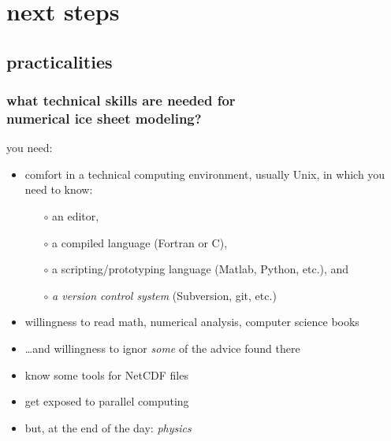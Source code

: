 
\section{next steps}

\subsection{practicalities}

\begin{frame}[fragile]
\frametitle{what technical skills are needed for \\ numerical ice sheet modeling?}

you need:

\begin{itemize}
\item comfort in a technical computing environment, usually Unix, in which you need to know:
  \begin{itemize}\small
  \item[$\circ$] an editor,
  \item[$\circ$] a compiled language (Fortran or C),
  \item[$\circ$] a scripting/prototyping language (Matlab, Python, etc.), and
  \item[$\circ$] \emph{a version control system} (Subversion, git, etc.)
  \normalsize
  \end{itemize}
\item willingness to read math, numerical analysis, computer science books
\item \dots and willingness to ignor \emph{some} of the advice found there
\item know some tools for NetCDF files
\item get exposed to parallel computing
\item but, at the end of the day: \emph{physics}
\end{itemize}
\end{frame}


